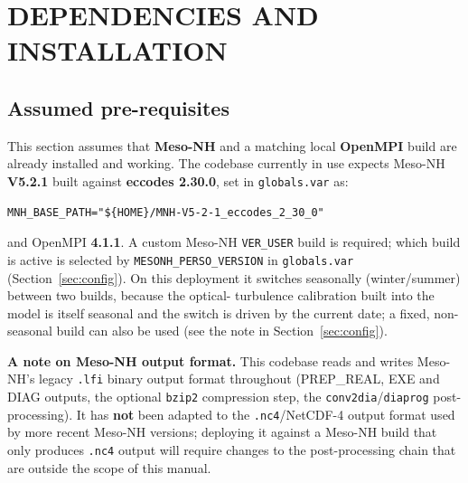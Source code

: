 \section{DEPENDENCIES AND INSTALLATION}
\label{sec:deps-install}

\subsection{Assumed pre-requisites}
This section assumes that \textbf{Meso-NH} and a matching local \textbf{OpenMPI} build are already
installed and working. The codebase currently in use expects Meso-NH \textbf{V5.2.1} built against
\textbf{eccodes 2.30.0}, set in \texttt{globals.var} as:
\begin{lstlisting}
MNH_BASE_PATH="${HOME}/MNH-V5-2-1_eccodes_2_30_0"
\end{lstlisting}
and OpenMPI \textbf{4.1.1}. A custom Meso-NH \texttt{VER\_USER} build is required; which build is active
is selected by \texttt{MESONH\_PERSO\_VERSION} in \texttt{globals.var} (Section~\ref{sec:config}). On
this deployment it switches seasonally (winter/summer) between two builds, because the optical-
turbulence calibration built into the model is itself seasonal and the switch is driven by the current
date; a fixed, non-seasonal build can also be used (see the note in Section~\ref{sec:config}).

\textbf{A note on Meso-NH output format.} This codebase reads and writes Meso-NH's legacy \texttt{.lfi}
binary output format throughout (PREP\_REAL, EXE and DIAG outputs, the optional \texttt{bzip2}
compression step, the \texttt{conv2dia}/\texttt{diaprog} post-processing). It has \textbf{not} been
adapted to the \texttt{.nc4}/NetCDF-4 output format used by more recent Meso-NH versions; deploying it
against a Meso-NH build that only produces \texttt{.nc4} output will require changes to the
post-processing chain that are outside the scope of this manual.


